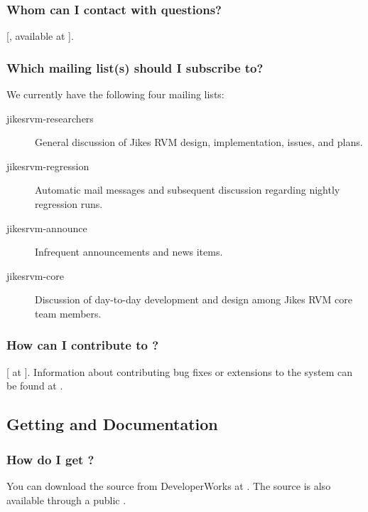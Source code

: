 \subsubsection{Whom can I contact with questions?}

[, available at {\tt \RVMDownloadURL}]{\RVMDownloadURL}.

\subsubsection{Which mailing list(s) should I subscribe to?}

We currently have the following four mailing lists:

\begin{description}
\item[jikesrvm-researchers]
    General discussion of Jikes RVM design, implementation, issues, and
    plans.
\item[jikesrvm-regression]
   Automatic mail messages and subsequent discussion regarding nightly
   regression runs.
\item[jikesrvm-announce]
  Infrequent announcements and news items.
\item[jikesrvm-core]
  Discussion of day-to-day development and design among Jikes RVM  core team
  members.
\end{description}


\subsubsection{How can I contribute to \jrvm{}?}
[ at
{\tt \RVMBugURL}]{\RVMBugURL}.  
Information about contributing bug fixes or extensions to the system
can be found at
\xlink{{\tt \RVMContribURL}}{\RVMContribURL}.   

\JavaTMFooter

\AIXPPCJikesTMFooter

\subsection{Getting \jrvm{} and Documentation}

\subsubsection{How do I get \jrvm{}?}

You can download the \jrvm{} source from DeveloperWorks at \xlink{{\tt
\RVMDownloadURL}}{\RVMDownloadURL}.  The \jrvm{} source is also available
through a public .


